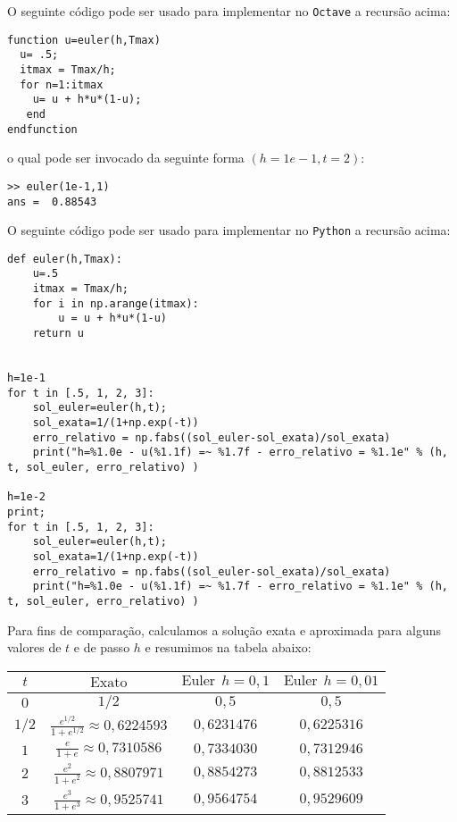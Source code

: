 \fi

\ifisoctave
O seguinte código pode ser usado para implementar no \verb+Octave+ a recursão acima:
\begin{verbatim}
function u=euler(h,Tmax)
  u= .5;
  itmax = Tmax/h;
  for n=1:itmax
    u= u + h*u*(1-u);
   end
endfunction
\end{verbatim}
o qual pode ser invocado da seguinte forma $\left(h=1e-1, t=2\right)$:
\begin{verbatim}
>> euler(1e-1,1)
ans =  0.88543
\end{verbatim}
\fi


\ifispython
O seguinte código pode ser usado para implementar no \verb+Python+ a recursão acima:

\begin{verbatim}
def euler(h,Tmax):
	u=.5
  	itmax = Tmax/h;
	for i in np.arange(itmax):
		u = u + h*u*(1-u)
	return u

	
h=1e-1
for t in [.5, 1, 2, 3]:
	sol_euler=euler(h,t);
	sol_exata=1/(1+np.exp(-t))
	erro_relativo = np.fabs((sol_euler-sol_exata)/sol_exata)
	print("h=%1.0e - u(%1.1f) =~ %1.7f - erro_relativo = %1.1e" % (h, t, sol_euler, erro_relativo) )

h=1e-2
print;
for t in [.5, 1, 2, 3]:
	sol_euler=euler(h,t);
	sol_exata=1/(1+np.exp(-t))
	erro_relativo = np.fabs((sol_euler-sol_exata)/sol_exata)
	print("h=%1.0e - u(%1.1f) =~ %1.7f - erro_relativo = %1.1e" % (h, t, sol_euler, erro_relativo) )

\end{verbatim}
\fi
Para fins de comparação, calculamos a solução exata e aproximada para alguns valores de $t$ e de passo $h$ e resumimos na tabela abaixo:

  \begin{tabular}{|c|c|c|c|}\hline
    $t$ & $\text{Exato}$ & $\text{Euler}~~ h=0,1$ & $\text{Euler}~~ h=0,01$\\\hline
    $0$ & $1/2$ & $0,5$ & $0,5$\\\hline
    $1/2$ & $\frac{e^{1/2}}{1+e^{1/2}}\approx 0,6224593$ & $0,6231476$ & $0,6225316$\\\hline
    $1$ & $\frac{e}{1+e}\approx 0,7310586$ & $0,7334030$ & $0,7312946$\\\hline
    $2$ & $\frac{e^2}{1+e^2}\approx  0,8807971$ & $0,8854273$  & $0,8812533$ \\\hline
    $3$ & $\frac{e^3}{1+e^3}\approx   0,9525741$  & $0,9564754$ & $0,9529609$ \\\hline
  \end{tabular}

